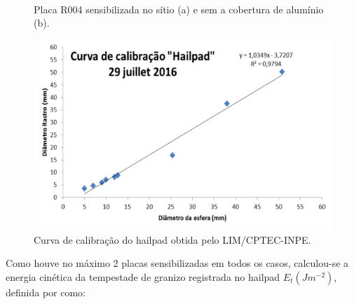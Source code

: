 \begin{figure}[htb]
	\begin{center}
		\caption{Placa R004 sensibilizada no sítio (a) e sem a cobertura de alumínio (b).} 
		\label{hailpad_exemplo}
		\quad
		\\
	\end{center}
\end{figure}

\begin{figure}[htb]
	\begin{center}
		\caption{Curva de calibração do hailpad obtida pelo LIM/CPTEC-INPE.} 
		\label{calibracao_hailpad}
		\includegraphics[width=0.7\columnwidth]{figs/calibracao_hailpad.png}
	\end{center}
\end{figure}

Como houve no máximo 2 placas sensibilizadas em todos os casos, calculou-se a energia cinética da tempestade de granizo registrada no hailpad $E_t (Jm^{-2})$, definida por  como:

